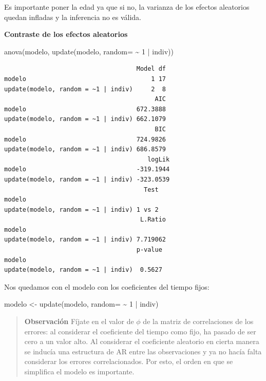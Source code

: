 \documentclass[
]{book}
\newenvironment{Shaded}{\begin{snugshade}}{\end{snugshade}}
\newcommand{\AttributeTok}[1]{\textcolor[rgb]{0.77,0.63,0.00}{#1}}
\newcommand{\DecValTok}[1]{\textcolor[rgb]{0.00,0.00,0.81}{#1}}
\newcommand{\FunctionTok}[1]{\textcolor[rgb]{0.00,0.00,0.00}{#1}}
\newcommand{\NormalTok}[1]{#1}
\newcommand{\OtherTok}[1]{\textcolor[rgb]{0.56,0.35,0.01}{#1}}
\newcommand{\SpecialCharTok}[1]{\textcolor[rgb]{0.00,0.00,0.00}{#1}}
\begin{document}
Es importante poner la edad ya que si no, la varianza de los efectos aleatorios quedan infladas y la inferencia no es válida.

\textbf{Contraste de los efectos aleatorios}

\begin{Shaded}
\begin{Highlighting}[]
\FunctionTok{anova}\NormalTok{(modelo, }\FunctionTok{update}\NormalTok{(modelo, }\AttributeTok{random=} \SpecialCharTok{\textasciitilde{}} \DecValTok{1} \SpecialCharTok{|}\NormalTok{ indiv))}
\end{Highlighting}
\end{Shaded}

\begin{verbatim}
                                    Model df
modelo                                  1 17
update(modelo, random = ~1 | indiv)     2  8
                                         AIC
modelo                              672.3888
update(modelo, random = ~1 | indiv) 662.1079
                                         BIC
modelo                              724.9826
update(modelo, random = ~1 | indiv) 686.8579
                                       logLik
modelo                              -319.1944
update(modelo, random = ~1 | indiv) -323.0539
                                      Test
modelo                                    
update(modelo, random = ~1 | indiv) 1 vs 2
                                     L.Ratio
modelo                                      
update(modelo, random = ~1 | indiv) 7.719062
                                    p-value
modelo                                     
update(modelo, random = ~1 | indiv)  0.5627
\end{verbatim}

Nos quedamos con el modelo con los coeficientes del tiempo fijos:

\begin{Shaded}
\begin{Highlighting}[]
\NormalTok{modelo }\OtherTok{\textless{}{-}} \FunctionTok{update}\NormalTok{(modelo, }\AttributeTok{random=} \SpecialCharTok{\textasciitilde{}} \DecValTok{1} \SpecialCharTok{|}\NormalTok{ indiv)}
\end{Highlighting}
\end{Shaded}

\begin{quote}
\textbf{Observación} Fíjate en el valor de \(\phi\) de la matriz de correlaciones de los errores: al considerar el coeficiente del tiempo como fijo, ha pasado de ser cero a un valor alto. Al considerar el coeficiente aleatorio en cierta manera se inducía una estructura de AR entre las observaciones y ya no hacía falta considerar los errores correlacionados. Por esto, el orden en que se simplifica el modelo es importante.
\end{quote}
\end{document}

